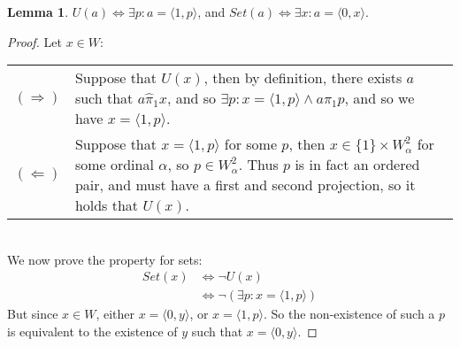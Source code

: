 \documentclass[11pt]{report}
\newcommand{\pleft}{\mathrel{\pi_1}}
\newcommand{\pair}[2]{\langle #1,#2 \rangle}
\newcommand{\zpleft}{\mathrel{\widehat{\pi}_1}}
\theoremstyle{definition}
\theoremstyle{theorem}
\theoremstyle{lemma}
\newtheorem{lemma}[theorem]{Lemma}
\begin{document}
\begin{lemma} $U(a) \Leftrightarrow \exists p: a = \pair{1}{p}$, and $Set(a)\Leftrightarrow \exists x: a = \pair{0}{x}$.
  \begin{proof} Let $x\in W$:

    \begin{tabular}{p{7mm} p{10.6cm}}
      $(\Rightarrow)$\rule{0pt}{5mm} &
      Suppose that $U(x)$, then by definition, there exists $a$ such that $a\zpleft x$, and so $\exists p: x=\pair{1}{p} \wedge a\pleft p$, and so we have $x=\pair{1}{p}$.
      \\
      $(\Leftarrow)$ &\rule{0pt}{5mm}
      Suppose that $x = \pair{1}{p}$ for some $p$, then $x\in\{1\}\times W_\alpha^2$ for some ordinal $\alpha$, so $p\in W_\alpha^2$.
      Thus $p$ is in fact an ordered pair, and must have a first and second projection, so it holds that $U(x)$.
    \end{tabular}\\

    \noindent
    We now prove the property for sets:
    \begin{align*}
      \mathit{Set}(x) &\iff \neg U(x) \\
                      &\iff \neg (\exists p: x=\pair{1}{p})
    \end{align*}
    But since $x\in W$, either $x = \pair{0}{y}$, or $x = \pair{1}{p}$. So the non-existence of such a $p$ is equivalent to the existence of $y$ such that $x=\pair{0}{y}$.
  \end{proof}
\end{lemma}
\end{document}
